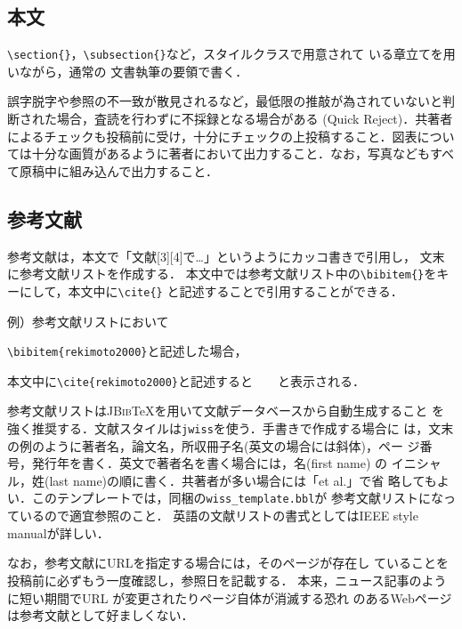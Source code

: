 \documentclass[twoside]{wiss}
\begin{document}
\subsection{本文}

\verb|\section{}|，\verb|\subsection{}|など，スタイルクラスで用意されて
いる章立てを用いながら，通常の \LaTeXe 文書執筆の要領で書く．

誤字脱字や参照の不一致が散見されるなど，最低限の推敲が為されていないと判断された場合，査読を行わずに不採録となる場合がある (Quick Reject)．共著者によるチェックも投稿前に受け，十分にチェックの上投稿すること．図表については十分な画質があるように著者において出力すること．なお，写真などもすべて原稿中に組み込んで出力すること．

\subsection{参考文献}
参考文献は，本文で「文献[3][4]で…」というようにカッコ書きで引用し，
文末に参考文献リストを作成する．
本文中では参考文献リスト中の\verb|\bibitem{}|をキーにして，本文中に\verb|\cite{}|
と記述することで引用することができる．

例）参考文献リストにおいて

\verb|\bibitem{rekimoto2000}|と記述した場合，

本文中に\verb|\cite{rekimoto2000}|と記述すると　\cite{rekimoto2000}　と表示される．

参考文献リストは\textsc{JBib}\TeX を用いて文献データベースから自動生成すること
を強く推奨する．文献スタイルは\verb|jwiss|を使う．手書きで作成する場合に
は，文末の例のように著者名，論文名，所収冊子名(英文の場合には斜体)，ペー
ジ番号，発行年を書く．英文で著者名を書く場合には，名(first name) の
イニシャル，姓(last name)の順に書く．共著者が多い場合には「et al.」で省
略してもよい．このテンプレートでは，同梱の\verb|wiss_template.bbl|が
参考文献リストになっているので適宜参照のこと．
英語の文献リストの書式としてはIEEE style manual\cite{ieee}が詳しい．

なお，参考文献にURLを指定する場合には，そのページが存在し
ていることを投稿前に必ずもう一度確認し，参照日を記載する．
本来，ニュース記事のように短い期間でURL が変更されたりページ自体が消滅する恐れ
のあるWebページは参考文献として好ましくない．
\end{document}

